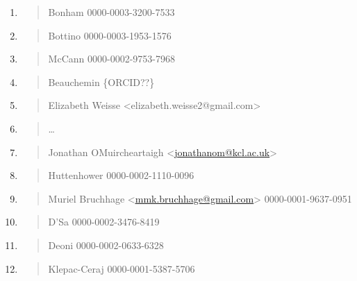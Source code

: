 \documentclass[
]{article}
\begin{document}
\begin{enumerate}
\def\labelenumi{\arabic{enumi}.}
\item
  \begin{quote}
  Bonham 0000-0003-3200-7533
  \end{quote}
\item
  \begin{quote}
  Bottino 0000-0003-1953-1576
  \end{quote}
\item
  \begin{quote}
  McCann 0000-0002-9753-7968
  \end{quote}
\item
  \begin{quote}
  Beauchemin \{ORCID??\}
  \end{quote}
\item
  \begin{quote}
  Elizabeth Weisse \textless elizabeth.weisse2@gmail.com\textgreater{}
  \end{quote}
\item
  \begin{quote}
  \ldots{}
  \end{quote}
\item
  \begin{quote}
  Jonathan O\textquotesingle Muircheartaigh
  \textless{}\href{mailto:jonathanom@kcl.ac.uk}{\uline{jonathanom@kcl.ac.uk}}\textgreater{}
  \end{quote}
\item
  \begin{quote}
  Huttenhower 0000-0002-1110-0096
  \end{quote}
\item
  \begin{quote}
  Muriel Bruchhage
  \textless{}\href{mailto:mmk.bruchhage@gmail.com}{\uline{mmk.bruchhage@gmail.com}}\textgreater{}
  0000-0001-9637-0951
  \end{quote}
\item
  \begin{quote}
  D'Sa 0000-0002-3476-8419
  \end{quote}
\item
  \begin{quote}
  Deoni 0000-0002-0633-6328
  \end{quote}
\item
  \begin{quote}
  Klepac-Ceraj 0000-0001-5387-5706
  \end{quote}
\end{enumerate}
\end{document}
